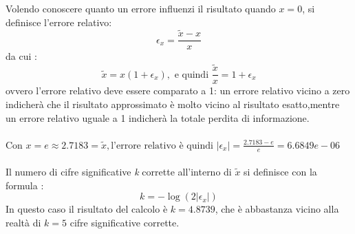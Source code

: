 Volendo conoscere quanto un errore influenzi il risultato quando $x=0$, si definisce l’errore relativo:
	\[
	\epsilon_x = \frac{\tilde{x}-x}{x} 
	\]
da cui :
	\[
	\tilde{x} = x(1+\epsilon_x), \text{ e quindi } \frac{\tilde{x}}{x} = 1 + \epsilon_x
	\]
ovvero l’errore relativo deve essere comparato a 1: un errore relativo vicino a zero indicherà che il risultato approssimato è molto vicino al risultato esatto,mentre un errore relativo uguale a 1 indicherà la totale perdita di informazione.\\\\
Con $x = e \approx 2.7183 = \tilde{x}, \text{l'errore relativo è quindi } |\epsilon_x| = \frac{2.7183 - e}{e} = 6.6849e-06$\\\\
Il numero di cifre significative \textit{k} corrette all’interno di $\tilde{x}$ si definisce con la formula :
	\[
	\textit{k} = -\log(2|\epsilon_x|)
	\]
In questo caso il risultato del calcolo è $\textit{k}=4.8739$, che è abbastanza vicino alla realtà di $\textit{k}=5$ cifre significative corrette.